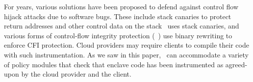  For years, various
solutions have been proposed to defend against control flow hijack attacks due
to software bugs. These include stack canaries to protect return addresses and
other control data on the stack~\cite{stackcanaries:handbookofinfosec} uses
stack canaries, and various forms of control-flow integrity protection
(\eg~\cite{xfi:osdi06, mip:ccs13, hypersafe:oak10,edgecfi:sec14}) use binary
rewriting to enforce CFI protection. Cloud providers may require clients to
compile their code with such instrumentation. As we saw in this paper, \tool\
can accommodate a variety of policy modules that check that enclave code has
been instrumented as agreed-upon by the cloud provider and the client.

